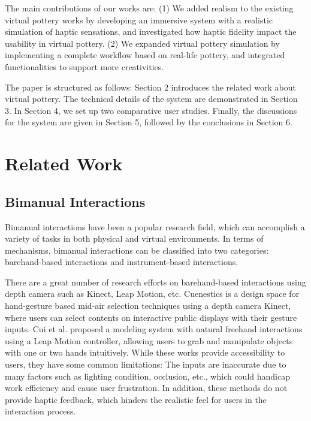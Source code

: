 \documentclass{svjour3}                     %
\begin{document}
The main contributions of our works are:
(1) We added realism to the existing virtual pottery works by developing an immersive system with a realistic simulation of haptic sensations, and investigated how haptic fidelity impact the usability in virtual pottery.
(2) We expanded virtual pottery simulation by implementing a complete workflow based on real-life pottery, and integrated functionalities to support more creativities.

The paper is structured as follows:
Section 2 introduces the related work about virtual pottery.
The technical details of the system are demonstrated in Section 3.
In Section 4, we set up two comparative user studies.
Finally, the discussions for the system are given in Section 5, followed by the conclusions in Section 6.

\section{Related Work}
\label{sec:related}

\subsection{Bimanual Interactions}
\label{sec:bimanual}
Bimanual interactions have been a popular research field, which can accomplish a variety of tasks in both physical and virtual environments.
In terms of mechanisms, bimanual interactions can be classified into two categories: barehand-based interactions and instrument-based interactions.

There are a great number of research efforts \cite{walter2014cuenesics,cui2016exploration,ramani2015gesture,murugappan2013handy,han2014virtual} on barehand-based interactions using depth camera such as Kinect, Leap Motion, etc.
Cuenestics \cite{walter2014cuenesics} is a design space for hand-gesture based mid-air selection techniques using a depth camera Kinect, where users can select contents on interactive public displays with their gesture inputs.
Cui et al. \cite{cui2016exploration} proposed a modeling system with natural freehand interactions using a Leap Motion controller, allowing users to grab and manipulate objects with one or two hands intuitively.
While these works provide accessibility to users, they have some common limitations: The inputs are inaccurate due to many factors such as lighting condition, occlusion, etc., which could handicap work efficiency and cause user frustration.
In addition, these methods do not provide haptic feedback, which hinders the realistic feel for users in the interaction process.
\end{document}

